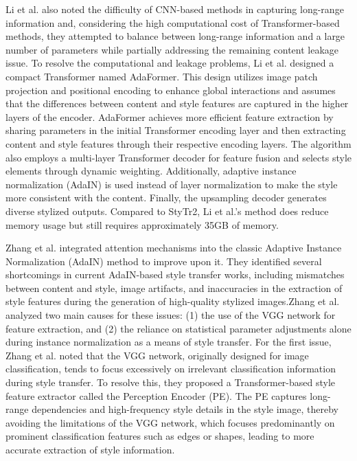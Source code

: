Li et al.\citep{50li2023compact} also noted the difficulty of CNN-based methods in capturing long-range information and, considering the high computational cost of Transformer-based methods, they attempted to balance between long-range information and a large number of parameters while partially addressing the remaining content leakage issue. To resolve the computational and leakage problems, Li et al. designed a compact Transformer named AdaFormer. This design utilizes image patch projection and positional encoding to enhance global interactions and assumes that the differences between content and style features are captured in the higher layers of the encoder. AdaFormer achieves more efficient feature extraction by sharing parameters in the initial Transformer encoding layer and then extracting content and style features through their respective encoding layers. The algorithm also employs a multi-layer Transformer decoder for feature fusion and selects style elements through dynamic weighting. Additionally, adaptive instance normalization (AdaIN)\citep{04huang2017arbitrary} is used instead of layer normalization to make the style more consistent with the content. Finally, the upsampling decoder generates diverse stylized outputs. Compared to StyTr2\citep{48liu2021adaattn}, Li et al.’s method does reduce memory usage but still requires approximately 35GB of memory\citep{50li2023compact}.

Zhang et al.\citep{51zhang2024rethink} integrated attention mechanisms into the classic Adaptive Instance Normalization (AdaIN)\citep{04huang2017arbitrary} method to improve upon it. They identified several shortcomings in current AdaIN-based\citep{04huang2017arbitrary} style transfer works, including mismatches between content and style, image artifacts, and inaccuracies in the extraction of style features during the generation of high-quality stylized images.Zhang et al.\citep{51zhang2024rethink} analyzed two main causes for these issues: (1) the use of the VGG network for feature extraction, and (2) the reliance on statistical parameter adjustments alone during instance normalization as a means of style transfer.
For the first issue, Zhang et al.\citep{51zhang2024rethink} noted that the VGG network, originally designed for image classification, tends to focus excessively on irrelevant classification information during style transfer. To resolve this, they proposed a Transformer-based style feature extractor called the Perception Encoder (PE). The PE captures long-range dependencies and high-frequency style details in the style image, thereby avoiding the limitations of the VGG network, which focuses predominantly on prominent classification features such as edges or shapes, leading to more accurate extraction of style information.

